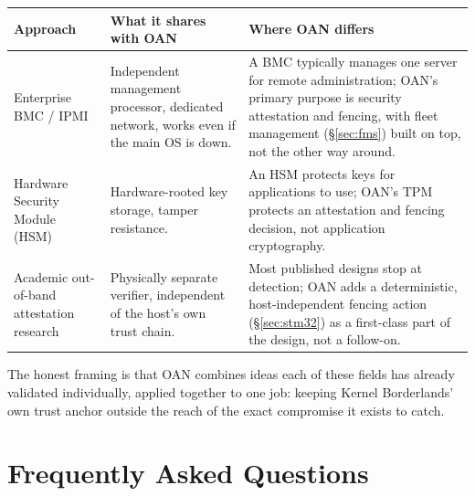 \documentclass[11pt,a4paper]{article}
\begin{document}
\begin{center}
\renewcommand{\arraystretch}{1.4}
\small
\begin{tabular}{@{}p{3.4cm}p{5.2cm}p{5.0cm}@{}}
\toprule
\textbf{Approach} & \textbf{What it shares with OAN} & \textbf{Where OAN differs} \\
\midrule
Enterprise BMC / IPMI~\cite{dmtfipmi} & Independent management processor, dedicated
network, works even if the main OS is down. & A BMC typically manages
one server for remote administration; OAN's primary purpose is
security attestation and fencing, with fleet management
(\S\ref{sec:fms}) built on top, not the other way around. \\
Hardware Security Module (HSM)~\cite{fips140} & Hardware-rooted key storage, tamper
resistance. & An HSM protects keys for applications to use; OAN's TPM
protects an attestation and fencing decision, not application
cryptography. \\
Academic out-of-band attestation research & Physically separate
verifier, independent of the host's own trust chain. & Most published
designs stop at detection; OAN adds a deterministic, host-independent
fencing action (\S\ref{sec:stm32}) as a first-class part of the
design, not a follow-on. \\
\bottomrule
\end{tabular}
\end{center}

The honest framing is that OAN combines ideas each of these fields has
already validated individually, applied together to one job: keeping
Kernel Borderlands' own trust anchor outside the reach of the exact
compromise it exists to catch.

\section{Frequently Asked Questions}
\label{sec:faq}
\end{document}
